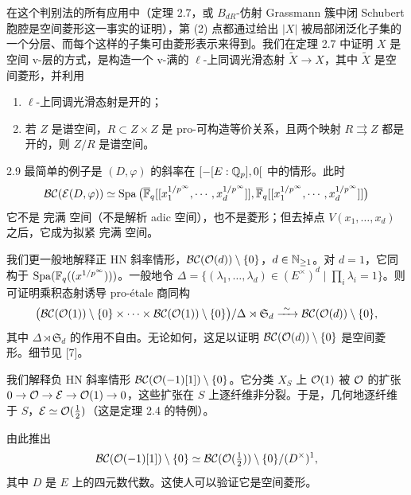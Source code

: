在这个判别法的所有应用中（定理 2.7，或 $B_{dR}$-仿射 Grassmann 簇中闭 Schubert 胞腔是空间菱形这一事实的证明），第 (2) 点都通过给出 $|X|$ 被局部闭泛化子集的一个分层、而每个这样的子集可由菱形表示来得到。我们在定理 2.7 中证明 $X$ 是空间 v-层的方式，是构造一个 v-满的 $\ell$-上同调光滑态射 $\widetilde X\to X$，其中 $\widetilde X$ 是空间菱形，并利用
\begin{enumerate}[label=(\arabic*),leftmargin=2.2em,itemsep=0.1em]
\item $\ell$-上同调光滑态射是开的；
\item 若 $Z$ 是谱空间，$R\subset Z\times Z$ 是 pro-可构造等价关系，且两个映射 $R\rightrightarrows Z$ 都是开的，则 $Z/R$ 是谱空间。
\end{enumerate}

\begin{exam}{2.9}
最简单的例子是 $(D,\varphi)$ 的斜率在 $[-[E:\mathbb{Q}_p],0[$ 中的情形。此时
\[
\mathcal{BC}(\mathcal E(D,\varphi))\simeq\operatorname{Spa}\big(\overline{\mathbb{F}}_q[[x_1^{1/p^\infty},\cdots,x_d^{1/p^\infty}]],\overline{\mathbb{F}}_q[[x_1^{1/p^\infty},\cdots,x_d^{1/p^\infty}]]\big)
\]
它不是 完满 空间（不是解析 adic 空间），也不是菱形；但去掉点 $V(x_1,\dots,x_d)$ 之后，它成为拟紧 完满 空间。
\label{exam:a3-2-9}
\end{exam}

我们更一般地解释正 HN 斜率情形，$\mathcal{BC}(\mathcal{O}(d))\setminus\{0\}$，$d\in\mathbb{N}_{\ge1}$。对 $d=1$，它同构于 $\operatorname{Spa}(\mathbb{F}_q((x^{1/p^\infty})))$。一般地令 $\Delta=\{(\lambda_1,\dots,\lambda_d)\in(E^\times)^d\mid\prod_i\lambda_i=1\}$。则可证明乘积态射诱导 pro-étale 商同构
\[
\big(\mathcal{BC}(\mathcal{O}(1))\setminus\{0\}\times\cdots\times\mathcal{BC}(\mathcal{O}(1))\setminus\{0\}\big)/\Delta\rtimes\mathfrak S_d\xrightarrow{\ \sim\ }\mathcal{BC}(\mathcal{O}(d))\setminus\{0\},
\]
其中 $\Delta\rtimes\mathfrak S_d$ 的作用不自由。无论如何，这足以证明 $\mathcal{BC}(\mathcal{O}(d))\setminus\{0\}$ 是空间菱形。细节见 [7]。

我们解释负 HN 斜率情形 $\mathcal{BC}(\mathcal{O}(-1)[1])\setminus\{0\}$。它分类 $X_S$ 上 $\mathcal{O}(1)$ 被 $\mathcal{O}$ 的扩张 $0\to\mathcal{O}\to\mathcal E\to\mathcal{O}(1)\to0$，这些扩张在 $S$ 上逐纤维非分裂。于是，几何地逐纤维于 $S$，$\mathcal E\simeq\mathcal{O}(\frac12)$（这是定理 2.4 的特例）。

由此推出
\[
\mathcal{BC}(\mathcal{O}(-1)[1])\setminus\{0\}\simeq\mathcal{BC}(\mathcal{O}(\tfrac12))\setminus\{0\}/(D^\times)^1,
\]
其中 $D$ 是 $E$ 上的四元数代数。这使人可以验证它是空间菱形。

